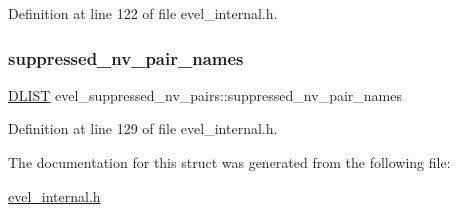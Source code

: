 Definition at line 122 of file evel\+\_\+internal.\+h.

\hypertarget{structevel__suppressed__nv__pairs_a7378a0a95b371e0edc13a4ab9ce8a26e}{}\label{structevel__suppressed__nv__pairs_a7378a0a95b371e0edc13a4ab9ce8a26e} 
\subsubsection{\texorpdfstring{suppressed\+\_\+nv\+\_\+pair\+\_\+names}{suppressed\_nv\_pair\_names}}
{\footnotesize\ttfamily \hyperlink{double__list_8h_a45f4a129042d9e1aa4ffd31fe13e4d14}{D\+L\+I\+ST} evel\+\_\+suppressed\+\_\+nv\+\_\+pairs\+::suppressed\+\_\+nv\+\_\+pair\+\_\+names}



Definition at line 129 of file evel\+\_\+internal.\+h.



The documentation for this struct was generated from the following file\+:\begin{DoxyCompactItemize}
\item 
\hyperlink{evel__internal_8h}{evel\+\_\+internal.\+h}\end{DoxyCompactItemize}
